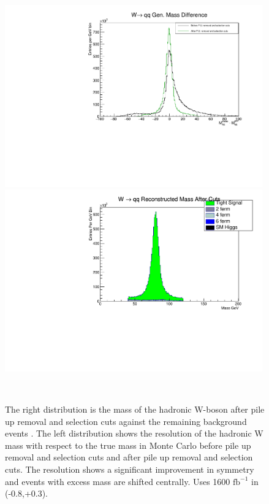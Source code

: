 \begin{figure}

\centering
    \begin{minipage}{0.49\textwidth}
        \centering
        \includegraphics[width=0.99\textwidth]{moneymassdiff.pdf} %
   
    \end{minipage}\hfill
    \begin{minipage}{0.49\textwidth}
        \centering
        \includegraphics[width=0.99\textwidth]{mwhadCutsHist.pdf} %
     
     \end{minipage}\\
     \caption{The right distribution is the mass of the hadronic W-boson after pile up removal and selection cuts against the remaining background events . The left distribution shows the resolution of the hadronic W mass with respect to the true mass in Monte Carlo before pile up removal and selection cuts and after pile up removal and selection cuts. The resolution shows a significant improvement in symmetry and events with excess mass are shifted centrally.  Uses 1600 $\text{fb}^{-1}$ in (-0.8,+0.3). 
}
\label{fig:money}
\end{figure}

